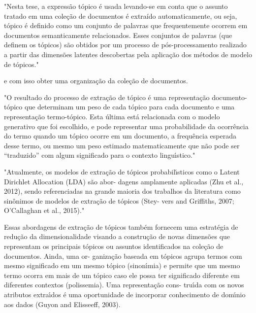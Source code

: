 "Nesta tese, a expressão tópico é usada levando-se em conta que o assunto tratado em uma coleção de documentos é extraído automaticamente, ou seja, tópico é definido como um conjunto de palavras que frequentemente ocorrem em documentos semanticamente relacionados. Esses conjuntos de palavras (que definem os tópicos) são obtidos por um processo de pós-processamento realizado a partir das dimensões latentes descobertas pela aplicação dos métodos de modelo de tópicos."  



e com isso obter uma organização da coleção de documentos.










"O resultado do processo de extração de tópico é uma representação documento-tópico que determinam um peso de cada tópico para cada documento e uma representação termo-tópico. Esta última está relacionada com o modelo generativo que foi escolhido, e pode representar uma probabilidade da ocorrência do termo quando um tópico ocorre em um documento, a frequência esperada desse termo, ou mesmo um peso estimado matematicamente que não pode ser “traduzido” com algum significado para o contexto linguı́stico."



"Atualmente, os modelos de extração de tópicos probabilı́sticos como o Latent Dirichlet Allocation (LDA) são abor- dagens amplamente aplicadas (Zhu et al., 2012), sendo referenciadas na grande maioria dos trabalhos da literatura como sinônimos de modelos de extração de tópicos (Stey- vers and Griffiths, 2007; O’Callaghan et al., 2015)."  


Essas abordagens de extração de tópicos também fornecem uma estratégia
de redução da dimensionalidade visando a construção de novas dimensões que representam
os principais tópicos ou assuntos identificados na coleção de documentos. Ainda, uma or-
ganização baseada em tópicos agrupa termos com mesmo significado em um mesmo tópico
(sinonı́mia) e permite que um mesmo termo ocorra em mais de um tópico caso ele possa
ter significado diferente em diferentes contextos (polissemia). Uma representação cons-
truı́da com os novos atributos extraı́dos é uma oportunidade de incorporar conhecimento
de domı́nio aos dados (Guyon and Elisseeff, 2003).


